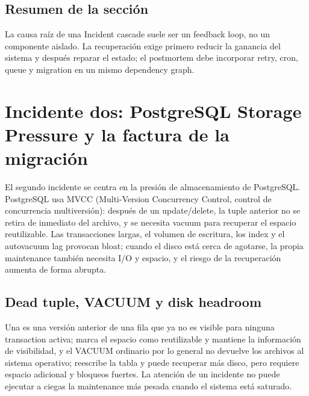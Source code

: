 \documentclass[a4paper]{article}
\begin{document}

\subsection{Resumen de la sección}

La causa raíz de una Incident cascade suele ser un feedback loop, no un componente aislado. La recuperación exige primero reducir la ganancia del sistema y después reparar el estado; el postmortem debe incorporar retry, cron, queue y migration en un mismo dependency graph.
\section{Incidente dos: PostgreSQL Storage Pressure y la factura de la migración}

El segundo incidente se centra en la presión de almacenamiento de PostgreSQL. PostgreSQL usa MVCC (Multi-Version Concurrency Control, control de concurrencia multiversión): después de un update/delete, la tuple anterior no se retira de inmediato del archivo, y se necesita vacuum para recuperar el espacio reutilizable. Las transacciones largas, el volumen de escritura, los index y el autovacuum lag provocan bloat; cuando el disco está cerca de agotarse, la propia maintenance también necesita I/O y espacio, y el riesgo de la recuperación aumenta de forma abrupta.

\subsection{Dead tuple, VACUUM y disk headroom}

Una  es una versión anterior de una fila que ya no es visible para ninguna transaction activa;  marca el espacio como reutilizable y mantiene la información de visibilidad, y el VACUUM ordinario por lo general no devuelve los archivos al sistema operativo;  reescribe la tabla y puede recuperar más disco, pero requiere espacio adicional y bloqueos fuertes. La atención de un incidente no puede ejecutar a ciegas la maintenance más pesada cuando el sistema está saturado.
\end{document}
